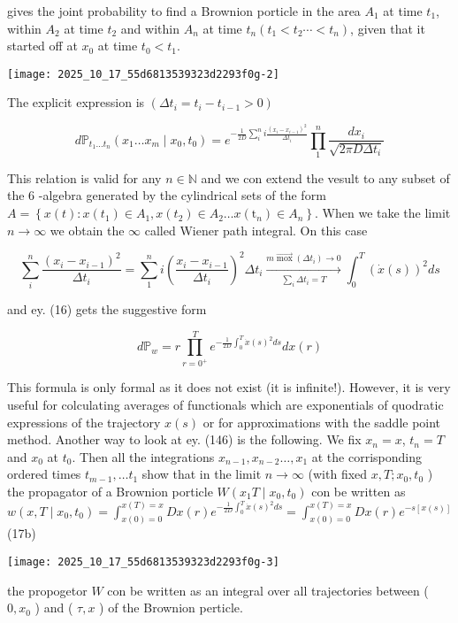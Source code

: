gives the joint probability to find a Brownion porticle in the area $A_{1}$ at time $t_{1}$, within $A_{2}$ at time $t_{2}$ and within $A_{n}$ at time $t_{n}\left(t_{1}<t_{2} \cdots<t_{n}\right)$, given that it started off at $x_{0}$ at time $t_{0}<t_{1}$.
\begin{center}
\texttt{[image: 2025\_10\_17\_55d6813539323d2293f0g-2]}
\end{center}

The explicit expression is $\left(\Delta t_{i}=t_{i}-t_{i-1}>0\right)$


\begin{equation*}
d \mathbb{P}_{t_{1} \ldots t_{n}}\left(x_{1} \ldots x_{m} \mid x_{0}, t_{0}\right)=e^{-\frac{1}{2 D} \sum_{i}^{n} i \frac{\left(x_{i}-x_{i-1}\right)^{2}}{\Delta t_{i}}} \prod_{1}^{n} \frac{d x_{i}}{\sqrt{2 \pi D \Delta t_{i}}} \tag{16}
\end{equation*}


This relation is valid for any $n \in \mathbb{N}$ and we con extend the vesult to any subset of the 6 -algebra generated by the cylindrical sets of the form $A=\left\{x(t): x\left(t_{1}\right) \in A_{1}, x\left(t_{2}\right) \in A_{2} \ldots x\left(\mathrm{t}_{n}\right) \in A_{n}\right\}$. When we take the limit $n \rightarrow \infty$ we obtain the $\infty$ called Wiener path integral. On this case

$$ 
\sum_{i}^{n} \frac{\left(x_{i}-x_{i-1}\right)^{2}}{\Delta t_{i}}=\sum_{1}^{n} i\left(\frac{x_{i}-x_{i-1}}{\Delta t_{i}}\right)^{2} \Delta t_{i} \xrightarrow[\sum_{i} \Delta t_{i}=T]{m \overrightarrow{\operatorname{mox}}\left(\Delta t_{i}\right) \rightarrow 0} \int_{0}^{T}(\dot{x}(s))^{2} d s
$$ 

and ey. (16) gets the suggestive form


\begin{equation*}
d \mathbb{P}_{w}=r \prod_{r=0^{+}}^{T} e^{-\frac{1}{2 D} \int_{0}^{T} \dot{x}(s)^{2} d s} d x(r) \tag{17}
\end{equation*}


This formula is only formal as it does not exist (it is infinite!). However, it is very useful for colculating averages of functionals which are
exponentials of quodratic expressions of the trajectory $x(s)$ or for approximations with the saddle point method.
Another way to look at ey. (146) is the following. We fix $x_{n}=x$, $t_{n}=T$ and $x_{0}$ at $t_{0}$. Then all the integrations $x_{n-1}, x_{n-2} \ldots, x_{1}$ at the corrisponding ordered times $t_{m-1}, \ldots t_{1}$ show that in the limit $n \rightarrow \infty$ (with fixed $x, T ; x_{0}, t_{0}$ ) the propagator of a Brownion porticle $W\left(x_{1} T \mid x_{0}, t_{0}\right)$ con be written as
$w\left(x, T \mid x_{0}, t_{0}\right)=\int_{x(0)=0}^{x(T)=x} D x(r) e^{-\frac{1}{2 D} \int_{0}^{T} \dot{x}(s)^{2} d s}=\int_{x(0)=0}^{x(T)=x} D x(r) e^{-s[x(s)]}$
(17b)
\begin{center}
\texttt{[image: 2025\_10\_17\_55d6813539323d2293f0g-3]}
\end{center}
the propogetor $W$ con be written as an integral over all trajectories between ( $0, x_{0}$ ) and ( $\tau, x$ ) of the Brownion perticle.

